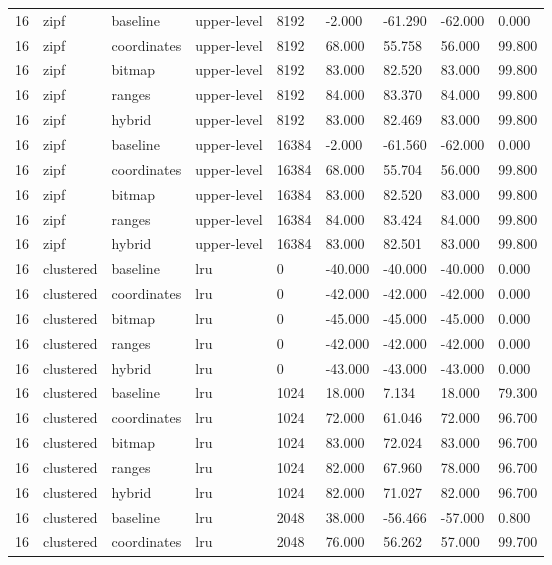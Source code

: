 \begin{tabular}{lllllllll}
16 & zipf & baseline & upper-level & 8192 & -2.000 & -61.290 & -62.000 & 0.000 \\
16 & zipf & coordinates & upper-level & 8192 & 68.000 & 55.758 & 56.000 & 99.800 \\
16 & zipf & bitmap & upper-level & 8192 & 83.000 & 82.520 & 83.000 & 99.800 \\
16 & zipf & ranges & upper-level & 8192 & 84.000 & 83.370 & 84.000 & 99.800 \\
16 & zipf & hybrid & upper-level & 8192 & 83.000 & 82.469 & 83.000 & 99.800 \\
16 & zipf & baseline & upper-level & 16384 & -2.000 & -61.560 & -62.000 & 0.000 \\
16 & zipf & coordinates & upper-level & 16384 & 68.000 & 55.704 & 56.000 & 99.800 \\
16 & zipf & bitmap & upper-level & 16384 & 83.000 & 82.520 & 83.000 & 99.800 \\
16 & zipf & ranges & upper-level & 16384 & 84.000 & 83.424 & 84.000 & 99.800 \\
16 & zipf & hybrid & upper-level & 16384 & 83.000 & 82.501 & 83.000 & 99.800 \\
16 & clustered & baseline & lru & 0 & -40.000 & -40.000 & -40.000 & 0.000 \\
16 & clustered & coordinates & lru & 0 & -42.000 & -42.000 & -42.000 & 0.000 \\
16 & clustered & bitmap & lru & 0 & -45.000 & -45.000 & -45.000 & 0.000 \\
16 & clustered & ranges & lru & 0 & -42.000 & -42.000 & -42.000 & 0.000 \\
16 & clustered & hybrid & lru & 0 & -43.000 & -43.000 & -43.000 & 0.000 \\
16 & clustered & baseline & lru & 1024 & 18.000 & 7.134 & 18.000 & 79.300 \\
16 & clustered & coordinates & lru & 1024 & 72.000 & 61.046 & 72.000 & 96.700 \\
16 & clustered & bitmap & lru & 1024 & 83.000 & 72.024 & 83.000 & 96.700 \\
16 & clustered & ranges & lru & 1024 & 82.000 & 67.960 & 78.000 & 96.700 \\
16 & clustered & hybrid & lru & 1024 & 82.000 & 71.027 & 82.000 & 96.700 \\
16 & clustered & baseline & lru & 2048 & 38.000 & -56.466 & -57.000 & 0.800 \\
16 & clustered & coordinates & lru & 2048 & 76.000 & 56.262 & 57.000 & 99.700 \\

\end{tabular}
